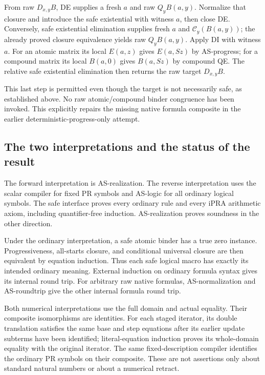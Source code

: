 From raw $D_{x,y}B$, DE supplies a fresh $a$ and raw $Q_yB(a,y)$.
Normalize that closure and introduce the safe existential with witness
$a$, then close DE. Conversely, safe existential elimination supplies
fresh $a$ and $\mathcal C_y(B(a,y))$; the already proved closure
equivalence yields raw $Q_yB(a,y)$. Apply DI with witness $a$.
For an atomic matrix its local $E(a,z)$ gives $E(a,Sz)$ by
AS-progress; for a compound matrix its local $B(a,0)$ gives
$B(a,Sz)$ by compound QE. The relative safe existential elimination
then returns the raw target $D_{x,y}B$.

This last step is permitted even though the target is not necessarily
safe, as established above. No raw atomic/compound binder congruence
has been invoked. This explicitly repairs the missing native formula
composite in the earlier deterministic-progress-only attempt.

\subsection{The two interpretations and the status of the result}

The forward interpretation is AS-realization. The reverse interpretation
uses the scalar compiler for fixed PR symbols and AS-logic for all
ordinary logical symbols. The safe interface proves every ordinary
rule and every iPRA arithmetic axiom, including quantifier-free
induction. AS-realization proves soundness in the other direction.

Under the ordinary interpretation, a safe atomic binder has a true
zero instance. Progressiveness, all-starts closure, and conditional
universal closure are then equivalent by equation induction. Thus
each safe logical macro has exactly its intended ordinary meaning.
External induction on ordinary formula syntax gives its internal
round trip. For arbitrary raw native formulas, AS-normalization and
AS-roundtrip give the other internal formula round trip.

Both numerical interpretations use the full domain and actual
equality. Their composite isomorphisms are identities. For each
staged iterator, its double translation satisfies the same base and
step equations after its earlier update subterms have been identified;
literal-equation induction proves its whole-domain equality with the
original iterator. The same fixed-description compiler identifies the
ordinary PR symbols on their composite. These are not assertions only
about standard natural numbers or about a numerical retract.

